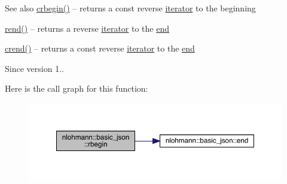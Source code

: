 \begin{DoxySeeAlso}{See also}
\mbox{\hyperlink{classnlohmann_1_1basic__json_a1e0769d22d54573f294da0e5c6abc9de}{crbegin()}} -- returns a const reverse \mbox{\hyperlink{classnlohmann_1_1basic__json_a099316232c76c034030a38faa6e34dca}{iterator}} to the beginning 

\mbox{\hyperlink{classnlohmann_1_1basic__json_ac77aed0925d447744676725ab0b6d535}{rend()}} -- returns a reverse \mbox{\hyperlink{classnlohmann_1_1basic__json_a099316232c76c034030a38faa6e34dca}{iterator}} to the \mbox{\hyperlink{classnlohmann_1_1basic__json_a13e032a02a7fd8a93fdddc2fcbc4763c}{end}} 

\mbox{\hyperlink{classnlohmann_1_1basic__json_a5795b029dbf28e0cb2c7a439ec5d0a88}{crend()}} -- returns a const reverse \mbox{\hyperlink{classnlohmann_1_1basic__json_a099316232c76c034030a38faa6e34dca}{iterator}} to the \mbox{\hyperlink{classnlohmann_1_1basic__json_a13e032a02a7fd8a93fdddc2fcbc4763c}{end}}
\end{DoxySeeAlso}
\begin{DoxySince}{Since}
version 1.. 
\end{DoxySince}
Here is the call graph for this function\+:\nopagebreak
\begin{figure}[H]
\begin{center}
\leavevmode
\includegraphics[width=350pt]{classnlohmann_1_1basic__json_a1ef93e2006dbe52667294f5ef38b0b10_cgraph}
\end{center}
\end{figure}
\mbox{\label{classnlohmann_1_1basic__json_a515e7618392317dbf4b72d3e18bf2ab2}} 
